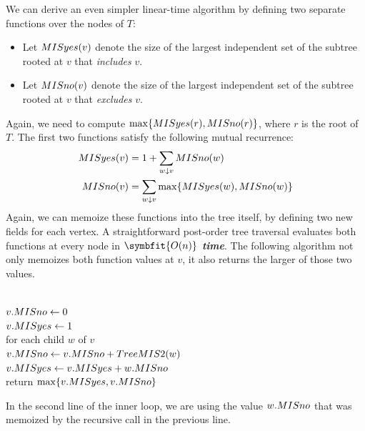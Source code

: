 We can derive an even simpler linear-time algorithm by defining two separate functions over the nodes of $T$:
\begin{itemize}
\item Let $MISyes(v)$ denote the size of the largest independent set of the subtree rooted at $v$ that \textit{includes} $v$.
\item Let $MISno(v)$ denote the size of the largest independent set of the subtree rooted at $v$ that \textit{excludes} $v$.
\end{itemize}
Again, we need to compute $\max\{MISyes(r), MISno(r)\}$, where $r$ is the root of $T$.
The first two functions satisfy the following mutual recurrence:
\begin{align*}
MISyes(v) &= 1 + \sum_{w \downarrow v} MISno(w)\\
MISno(v) &= \sum_{w \downarrow v} \max\{MISyes(w), MISno(w)\}
\end{align*}
Again, we can memoize these functions into the tree itself, by defining two new fields for each vertex.
A straightforward post-order tree traversal evaluates both functions at every node in \textbf{\textit{$\symbfit{O(n)}$ time}}.
The following algorithm not only memoizes both function values at $v$, it also returns the larger of those two values.

\begin{pseudocode}
\\
$v.MISno \gets 0$\\
$v.MISyes \gets 1$\\
for each child $w$ of $v$\\
\Indent $v.MISno \gets v.MISno + TreeMIS2(w)$\\
\Indent $v.MISyes \gets v.MISyes + w.MISno$\\
return $\max\{v.MISyes, v.MISno\}$
\end{pseudocode}

In the second line of the inner loop, we are using the value $w.MISno$ that was memoized by the recursive call in the previous line.

\section*{\ExercisesName}
\markright{\ExercisesName}

